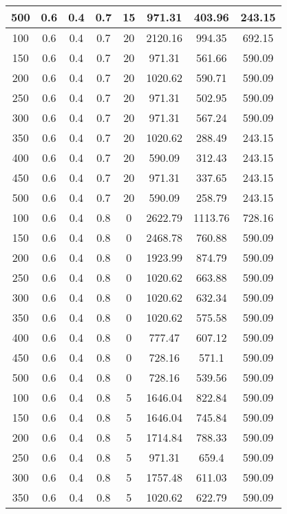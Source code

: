 \documentclass[a4paper, 12pt]{extreport}
\begin{document}
\begin{itemize}
\begin{longtable}{|c|c|c|c|c|c|c|c|}
			500 & 0.6 & 0.4 & 0.7 & 15 & 971.31 & 403.96 & 243.15 \\\hline
			100 & 0.6 & 0.4 & 0.7 & 20 & 2120.16 & 994.35 & 692.15 \\\hline
			150 & 0.6 & 0.4 & 0.7 & 20 & 971.31 & 561.66 & 590.09 \\\hline
			200 & 0.6 & 0.4 & 0.7 & 20 & 1020.62 & 590.71 & 590.09 \\\hline
			250 & 0.6 & 0.4 & 0.7 & 20 & 971.31 & 502.95 & 590.09 \\\hline
			300 & 0.6 & 0.4 & 0.7 & 20 & 971.31 & 567.24 & 590.09 \\\hline
			350 & 0.6 & 0.4 & 0.7 & 20 & 1020.62 & 288.49 & 243.15 \\\hline
			400 & 0.6 & 0.4 & 0.7 & 20 & 590.09 & 312.43 & 243.15 \\\hline
			450 & 0.6 & 0.4 & 0.7 & 20 & 971.31 & 337.65 & 243.15 \\\hline
			500 & 0.6 & 0.4 & 0.7 & 20 & 590.09 & 258.79 & 243.15 \\\hline
			100 & 0.6 & 0.4 & 0.8 & 0 & 2622.79 & 1113.76 & 728.16 \\\hline
			150 & 0.6 & 0.4 & 0.8 & 0 & 2468.78 & 760.88 & 590.09 \\\hline
			200 & 0.6 & 0.4 & 0.8 & 0 & 1923.99 & 874.79 & 590.09 \\\hline
			250 & 0.6 & 0.4 & 0.8 & 0 & 1020.62 & 663.88 & 590.09 \\\hline
			300 & 0.6 & 0.4 & 0.8 & 0 & 1020.62 & 632.34 & 590.09 \\\hline
			350 & 0.6 & 0.4 & 0.8 & 0 & 1020.62 & 575.58 & 590.09 \\\hline
			400 & 0.6 & 0.4 & 0.8 & 0 & 777.47 & 607.12 & 590.09 \\\hline
			450 & 0.6 & 0.4 & 0.8 & 0 & 728.16 & 571.1 & 590.09 \\\hline
			500 & 0.6 & 0.4 & 0.8 & 0 & 728.16 & 539.56 & 590.09 \\\hline
			100 & 0.6 & 0.4 & 0.8 & 5 & 1646.04 & 822.84 & 590.09 \\\hline
			150 & 0.6 & 0.4 & 0.8 & 5 & 1646.04 & 745.84 & 590.09 \\\hline
			200 & 0.6 & 0.4 & 0.8 & 5 & 1714.84 & 788.33 & 590.09 \\\hline
			250 & 0.6 & 0.4 & 0.8 & 5 & 971.31 & 659.4 & 590.09 \\\hline
			300 & 0.6 & 0.4 & 0.8 & 5 & 1757.48 & 611.03 & 590.09 \\\hline
			350 & 0.6 & 0.4 & 0.8 & 5 & 1020.62 & 622.79 & 590.09 \\\hline

\end{longtable}
\end{itemize}
\end{document}
